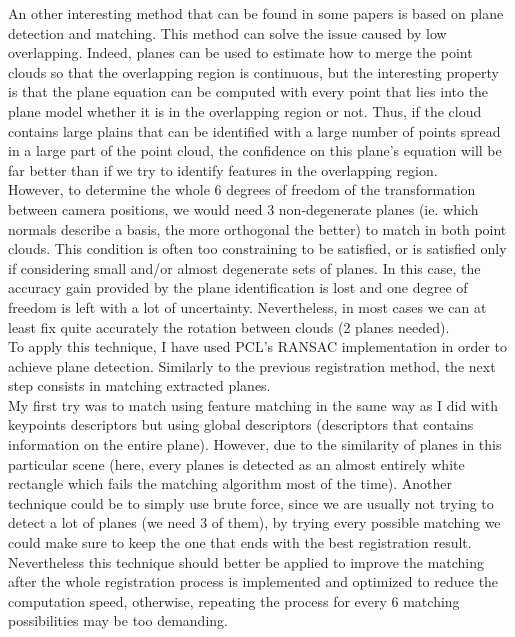 An other interesting method that can be found in some papers is based on plane detection and matching. This method can solve the issue caused by low overlapping. Indeed, planes can be used to estimate how to merge the point clouds so that the overlapping region is continuous, but the interesting property is that the plane equation can be computed with every point that lies into the plane model whether it is in the overlapping region or not. Thus, if the cloud contains large plains that can be identified with a large number of points spread in a large part of the point cloud, the confidence on this plane's equation will be far better than if we try to identify features in the overlapping region. \\
However, to determine the whole 6 degrees of freedom of the transformation between camera positions, we would need 3 non-degenerate planes (ie. which normals describe a basis, the more orthogonal the better) to match in both point clouds. This condition is often too constraining to be satisfied, or is satisfied only if considering small and/or almost degenerate sets of planes. In this case, the accuracy gain provided by the plane identification is lost and one degree of freedom is left with a lot of uncertainty. Nevertheless, in most cases we can at least fix quite accurately the rotation between clouds (2 planes needed). \\
To apply this technique, I have used PCL's RANSAC implementation in order to achieve plane detection. Similarly to the previous registration method, the next step consists in matching extracted planes. \\
My first try was to match using feature matching in the same way as I did with keypoints descriptors but using global descriptors (descriptors that contains information on the entire plane). However, due to the similarity of planes in this particular scene (here, every planes is detected as an almost entirely white rectangle which fails the matching algorithm most of the time). Another technique could be to simply use brute force, since we are usually not trying to detect a lot of planes (we need 3 of them), by trying every possible matching we could make sure to keep the one that ends with the best registration result. Nevertheless this technique should better be applied to improve the matching after the whole registration process is implemented and optimized to reduce the computation speed, otherwise, repeating the process for every 6 matching possibilities may be too demanding. \\
